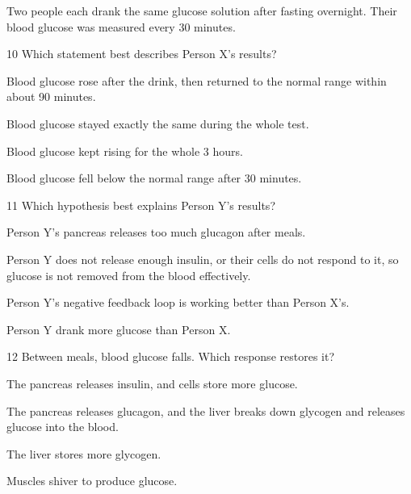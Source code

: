 \documentclass[11pt,letterpaper]{article}
\begin{document}

Two people each drank the same glucose solution after fasting overnight. Their blood glucose was measured every 30 minutes.


\begin{mcq}{10}
Which statement best describes Person X's results?
\begin{choices}
  \item Blood glucose rose after the drink, then returned to the normal range within about 90 minutes.
  \item Blood glucose stayed exactly the same during the whole test.
  \item Blood glucose kept rising for the whole 3 hours.
  \item Blood glucose fell below the normal range after 30 minutes.
\end{choices}
\end{mcq}

\begin{mcq}{11}
Which hypothesis best explains Person Y's results?
\begin{choices}
  \item Person Y's pancreas releases too much glucagon after meals.
  \item Person Y does not release enough insulin, or their cells do not respond to it, so glucose is not removed from the blood effectively.
  \item Person Y's negative feedback loop is working better than Person X's.
  \item Person Y drank more glucose than Person X.
\end{choices}
\end{mcq}

\begin{mcq}{12}
Between meals, blood glucose falls. Which response restores it?
\begin{choices}
  \item The pancreas releases insulin, and cells store more glucose.
  \item The pancreas releases glucagon, and the liver breaks down glycogen and releases glucose into the blood.
  \item The liver stores more glycogen.
  \item Muscles shiver to produce glucose.
\end{choices}
\end{mcq}
\end{document}
